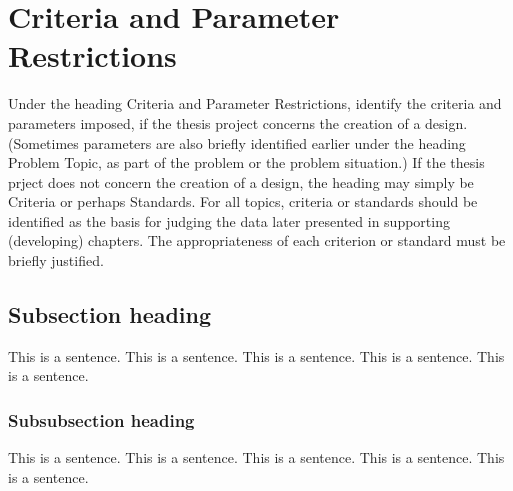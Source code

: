 \section{Criteria and Parameter Restrictions}

Under the heading Criteria and Parameter Restrictions, identify the criteria and parameters imposed, if the thesis project concerns the creation of a design.  (Sometimes parameters are also briefly identified earlier under the heading Problem Topic, as part of the problem or the problem situation.)  If the thesis prject does not concern the creation of a design, the heading may simply be Criteria or perhaps Standards.  For all topics, criteria or standards should be identified as the basis for judging the data later presented in supporting (developing) chapters.  The appropriateness of each criterion or standard must be briefly justified.
\subsection{Subsection heading}

This is a sentence.
This is a sentence.
This is a sentence.
This is a sentence.
This is a sentence.


\subsubsection{Subsubsection heading}

This is a sentence.
This is a sentence.
This is a sentence.
This is a sentence.
This is a sentence.
